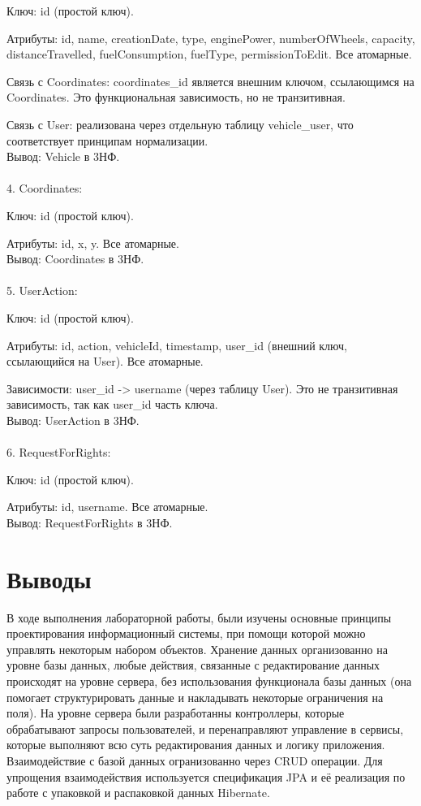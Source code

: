 \documentclass{article}
\begin{document}
Ключ: id (простой ключ).

Атрибуты: id, name, creationDate, type, enginePower, numberOfWheels, capacity, distanceTravelled, fuelConsumption, fuelType, permissionToEdit. Все атомарные.

Связь с Coordinates: coordinates\_id является внешним ключом, ссылающимся на Coordinates. Это функциональная зависимость, но не транзитивная.

Связь с User: реализована через отдельную таблицу vehicle\_user, что соответствует принципам нормализации.
\\
Вывод: Vehicle в 3НФ.
\\\\
4. Coordinates:

Ключ: id (простой ключ).

Атрибуты: id, x, y. Все атомарные.
\\
Вывод: Coordinates в 3НФ.
\\\\
5. UserAction:

Ключ: id (простой ключ).

Атрибуты: id, action, vehicleId, timestamp, user\_id (внешний ключ, ссылающийся на User). Все атомарные.

Зависимости: user\_id -> username (через таблицу User). Это не транзитивная зависимость, так как user\_id часть ключа.
\\
Вывод: UserAction в 3НФ.
\\\\
6. RequestForRights:

Ключ: id (простой ключ).

Атрибуты: id, username. Все атомарные.
\\
Вывод: RequestForRights в 3НФ.

\section{Выводы}
        В ходе выполнения лабораторной работы, были изучены основные принципы проектирования информационный системы, при помощи которой можно управлять некоторым набором объектов. Хранение данных организованно на уровне базы данных, любые действия, связанные с редактирование данных происходят на уровне сервера, без использования функционала базы данных (она помогает структурировать данные и накладывать некоторые ограничения на поля).
        На уровне сервера были разработанны контроллеры, которые обрабатывают запросы пользователей, и перенаправляют управление в сервисы, которые выполняют всю суть редактирования данных и логику приложения. Взаимодействие с базой данных огранизованно через CRUD операции. Для упрощения взаимодействия используется спецификация JPA и её реализация по работе с упаковкой и распаковкой данных Hibernate.
\end{document}

